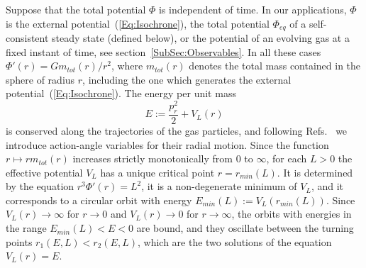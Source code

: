 Suppose that the total potential $\Phi$ is independent of time. In our applications, $\Phi$ is the external potential~(\ref{Eq:Isochrone}), the total potential $\Phi_{eq}$ of a self-consistent steady state (defined below), or the potential of an evolving gas at a fixed instant of time, see section~\ref{SubSec:Observables}. In all these cases $\Phi'(r) = G m_{tot}(r)/r^2$, where $m_{tot}(r)$ denotes the total mass contained in the sphere of radius $r$, including the one which generates the external potential~(\ref{Eq:Isochrone}). The energy per unit mass
\begin{equation}
E := \frac{p_r^2}{2} + V_L(r)
\label{Eq:EDef}
\end{equation}
is conserved along the trajectories of the gas particles, and following Refs.~\cite{BinneyTremaine-Book,pRoS20} we introduce action-angle variables for their radial motion. Since the function $r\mapsto r m_{tot}(r)$ increases strictly monotonically from $0$ to $\infty$, for each $L > 0$ the effective potential $V_L$ has a unique critical point $r = r_{min}(L)$. It is determined by the equation $r^3\Phi'(r) = L^2$, it is a non-degenerate minimum of $V_L$, and it corresponds to a circular orbit with energy $E_{min}(L) := V_L(r_{min}(L))$. Since $V_L(r)\to \infty$ for $r\to 0$ and $V_L(r)\to 0$ for $r\to \infty$, the orbits with energies in the range $E_{min}(L) < E < 0$ are bound, and they oscillate between the turning points $r_1(E,L) < r_2(E,L)$, which are the two solutions of the equation $V_L(r) = E$.

